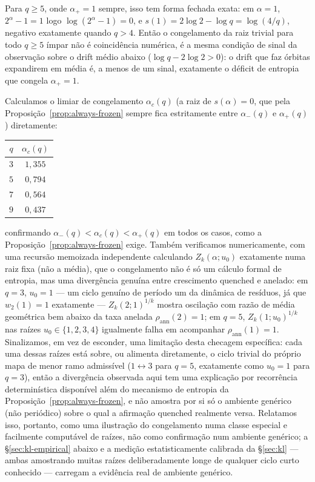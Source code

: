 \documentclass[11pt]{article}
\theoremstyle{definition}
\theoremstyle{remark}
\begin{document}
Para $q\ge5$, onde $\alpha_+=1$ sempre, isso tem forma fechada exata:
em $\alpha=1$, $2^\alpha-1=1$ logo $\log(2^\alpha-1)=0$, e
$s(1)=2\log2-\log q=\log(4/q)$, negativo exatamente quando $q>4$.
Então o congelamento da raiz trivial para todo $q\ge5$ ímpar não é
coincidência numérica, é a mesma condição de sinal da observação sobre
o drift médio abaixo ($\log q-2\log2>0$): o drift que faz órbitas
expandirem em média é, a menos de um sinal, exatamente o déficit de
entropia que congela $\alpha_+=1$.

Calculamos o limiar de congelamento $\alpha_c(q)$ (a raiz de
$s(\alpha)=0$, que pela Proposição~\ref{prop:always-frozen} sempre fica
estritamente entre $\alpha_-(q)$ e $\alpha_+(q)$) diretamente:
\begin{center}
\begin{tabular}{c|c}
$q$ & $\alpha_c(q)$ \\ \hline
$3$ & $1{,}355$ \\
$5$ & $0{,}794$ \\
$7$ & $0{,}564$ \\
$9$ & $0{,}437$
\end{tabular}
\end{center}
confirmando $\alpha_-(q)<\alpha_c(q)<\alpha_+(q)$ em todos os casos,
como a Proposição~\ref{prop:always-frozen} exige. Também verificamos
numericamente, com uma recursão memoizada independente calculando
$Z_k(\alpha;u_0)$ exatamente numa raiz fixa (não a média), que o
congelamento não é só um cálculo formal de entropia, mas uma divergência
genuína entre crescimento quenched e anelado: em $q=3$, $u_0=1$ --- um
ciclo genuíno de período um da dinâmica de resíduos, já que $w_2(1)=1$
exatamente --- $Z_k(2;1)^{1/k}$ mostra oscilação com razão de média
geométrica bem abaixo da taxa anelada $\rho_{\mathrm{ann}}(2)=1$; em
$q=5$, $Z_k(1;u_0)^{1/k}$ nas raízes $u_0\in\{1,2,3,4\}$
igualmente falha em acompanhar $\rho_{\mathrm{ann}}(1)=1$. Sinalizamos,
em vez de esconder, uma limitação desta checagem específica: cada uma
dessas raízes está sobre, ou alimenta diretamente, o ciclo trivial do
próprio mapa de menor ramo admissível ($1\leftrightarrow3$ para $q=5$,
exatamente como $u_0=1$ para $q=3$), então a divergência observada
aqui tem uma explicação por recorrência determinística disponível além
do mecanismo de entropia da Proposição~\ref{prop:always-frozen}, e não
amostra por si só o ambiente genérico (não periódico) sobre o qual a
afirmação quenched realmente versa. Relatamos isso, portanto, como uma
ilustração do congelamento numa classe especial e facilmente computável
de raízes, não como confirmação num ambiente genérico; a
\S\ref{sec:kl-empirical} abaixo e a medição estatisticamente calibrada
da \S\ref{sec:kl} --- ambas amostrando muitas raízes deliberadamente
longe de qualquer ciclo curto conhecido --- carregam a evidência real
de ambiente genérico.
\end{document}
